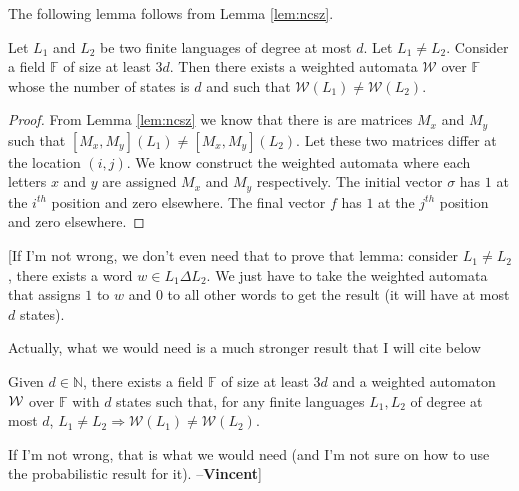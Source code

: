 \documentclass[english,course]{lecture}
\newcommand{\Mxy}[1]{[M_x,M_y](#1)}
\newcommand{\field}{\mathbb{F}}
\newcommand{\wa}[1]{\mathcal{W}#1}
\newcommand\vincent[1]{{\color{blue} [#1 --\textbf{Vincent}]}}
\begin{document}
The following lemma follows from Lemma \ref{lem:ncsz}.
\begin{lemma}
\label{lem:wa}
Let $L_1$ and $L_2$ be two finite languages of degree at most $d$. Let $L_1 \neq L_2$. Consider a field $\field$ of size at least $3d$. Then there exists a weighted automata $\wa{}$ over $\field$ whose the number of states is $d$ and such that $\wa{(L_1)} \neq \wa{(L_2)}$.
\end{lemma}
\begin{proof}
From Lemma \ref{lem:ncsz} we know that there is are matrices $M_x$ and $M_y$ such that $\Mxy {L_1} \neq \Mxy {L_2}$. Let these two matrices differ at the location $(i,j)$. We know construct the weighted automata where each letters $x$ and $y$ are assigned $M_x$ and $M_y$ respectively. The initial vector $\sigma$ has $1$ at the $i^{th}$ position and zero elsewhere. The final vector $f$ has $1$ at the $j^{th}$ position and zero elsewhere.
\end{proof}

\vincent{If I'm not wrong, we don't even need that to prove that lemma: consider $L_1 \neq L_2$, there exists a word $w \in L_1 \Delta L_2$. We just have to take the weighted automata that assigns $1$ to $w$ and $0$ to all other words to get the result (it will have at most $d$ states).

Actually, what we would need is a much stronger result that I will cite below

\begin{lemma}
    Given $d\in\mathbb{N}$, there exists a field $\field$ of size at least $3d$ and a weighted automaton $\wa$ over $\field$ with $d$ states such that, for any finite languages $L_1, L_2$ of degree at most $d$, $L_1 \neq L_2 \Rightarrow \wa(L_1) \neq \wa(L_2)$.
\end{lemma}

If I'm not wrong, that is what we would need (and I'm not sure on how to use the probabilistic result for it).
}
\end{document}
